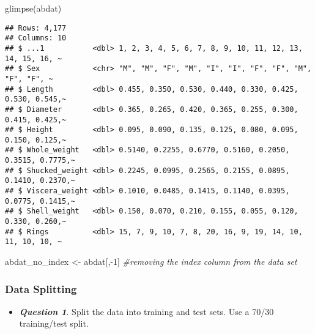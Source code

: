 \documentclass[
]{article}
\newenvironment{Shaded}{\begin{snugshade}}{\end{snugshade}}
\newcommand{\CommentTok}[1]{\textcolor[rgb]{0.56,0.35,0.01}{\textit{#1}}}
\newcommand{\DecValTok}[1]{\textcolor[rgb]{0.00,0.00,0.81}{#1}}
\newcommand{\FunctionTok}[1]{\textcolor[rgb]{0.00,0.00,0.00}{#1}}
\newcommand{\NormalTok}[1]{#1}
\newcommand{\OtherTok}[1]{\textcolor[rgb]{0.56,0.35,0.01}{#1}}
\newcommand{\SpecialCharTok}[1]{\textcolor[rgb]{0.00,0.00,0.00}{#1}}
\providecommand{\tightlist}{%
  \setlength{\itemsep}{0pt}\setlength{\parskip}{0pt}}
\begin{document}
\begin{Shaded}
\begin{Highlighting}[]
\FunctionTok{glimpse}\NormalTok{(abdat)}
\end{Highlighting}
\end{Shaded}

\begin{verbatim}
## Rows: 4,177
## Columns: 10
## $ ...1           <dbl> 1, 2, 3, 4, 5, 6, 7, 8, 9, 10, 11, 12, 13, 14, 15, 16, ~
## $ Sex            <chr> "M", "M", "F", "M", "I", "I", "F", "F", "M", "F", "F", ~
## $ Length         <dbl> 0.455, 0.350, 0.530, 0.440, 0.330, 0.425, 0.530, 0.545,~
## $ Diameter       <dbl> 0.365, 0.265, 0.420, 0.365, 0.255, 0.300, 0.415, 0.425,~
## $ Height         <dbl> 0.095, 0.090, 0.135, 0.125, 0.080, 0.095, 0.150, 0.125,~
## $ Whole_weight   <dbl> 0.5140, 0.2255, 0.6770, 0.5160, 0.2050, 0.3515, 0.7775,~
## $ Shucked_weight <dbl> 0.2245, 0.0995, 0.2565, 0.2155, 0.0895, 0.1410, 0.2370,~
## $ Viscera_weight <dbl> 0.1010, 0.0485, 0.1415, 0.1140, 0.0395, 0.0775, 0.1415,~
## $ Shell_weight   <dbl> 0.150, 0.070, 0.210, 0.155, 0.055, 0.120, 0.330, 0.260,~
## $ Rings          <dbl> 15, 7, 9, 10, 7, 8, 20, 16, 9, 19, 14, 10, 11, 10, 10, ~
\end{verbatim}

\begin{Shaded}
\begin{Highlighting}[]
\NormalTok{abdat\_no\_index }\OtherTok{\textless{}{-}}\NormalTok{ abdat[,}\SpecialCharTok{{-}}\DecValTok{1}\NormalTok{] }\CommentTok{\#removing the index column from the data set}
\end{Highlighting}
\end{Shaded}

\hypertarget{data-splitting}{%
\subsubsection{Data Splitting}\label{data-splitting}}

\begin{itemize}
\tightlist
\item
  \textbf{\emph{Question 1}}. Split the data into training and test
  sets. Use a 70/30 training/test split.
\end{itemize}
\end{document}
